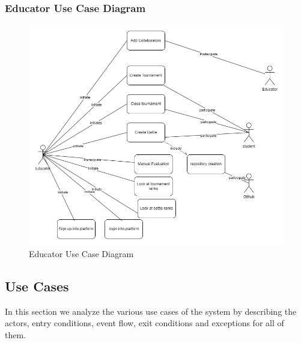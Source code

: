 \subsubsection{Educator Use Case Diagram}
\begin{figure}[H]
    \centering
    \includegraphics[width=1\linewidth]{misc//Images//UC/EducatorScenarios.png}
    \caption{Educator Use Case Diagram}
    \label{fig:enter-label}
\end{figure}

\subsection{Use Cases}
In this section we analyze the various use cases of the system by describing the actors, entry conditions, event flow, exit conditions and exceptions for all of them.

\newpage

